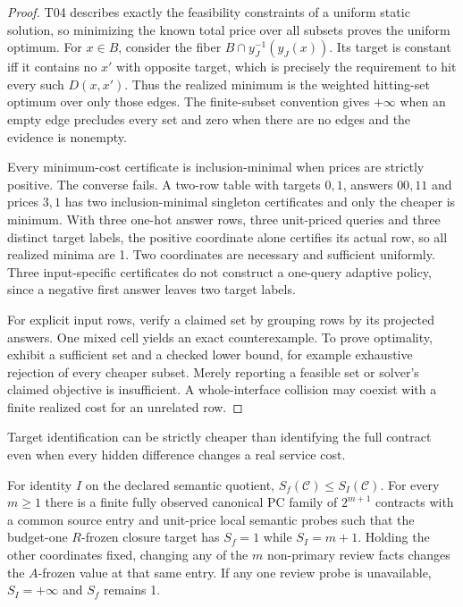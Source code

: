 \begin{proof}

T04 describes exactly the feasibility constraints of a uniform static solution, so minimizing the known total price over all subsets proves the uniform optimum. For \(x\in B\), consider the fiber \(B\cap y_J^{-1}(y_J(x))\). Its target is constant iff it contains no \(x'\) with opposite target, which is precisely the requirement to hit every such \(D(x,x')\). Thus the realized minimum is the weighted hitting-set optimum over only those edges. The finite-subset convention gives \(+\infty\) when an empty edge precludes every set and zero when there are no edges and the evidence is nonempty.

Every minimum-cost certificate is inclusion-minimal when prices are strictly positive. The converse fails. A two-row table with targets \(0,1\), answers \(00,11\) and prices \(3,1\) has two inclusion-minimal singleton certificates and only the cheaper is minimum. With three one-hot answer rows, three unit-priced queries and three distinct target labels, the positive coordinate alone certifies its actual row, so all realized minima are 1. Two coordinates are necessary and sufficient uniformly. Three input-specific certificates do not construct a one-query adaptive policy, since a negative first answer leaves two target labels.

For explicit input rows, verify a claimed set by grouping rows by its projected answers. One mixed cell yields an exact counterexample. To prove optimality, exhibit a sufficient set and a checked lower bound, for example exhaustive rejection of every cheaper subset. Merely reporting a feasible set or solver's claimed objective is insufficient. A whole-interface collision may coexist with a finite realized cost for an unrelated row.

\end{proof}

Target identification can be strictly cheaper than identifying the full contract even when every hidden difference changes a real service cost.

\begin{theorem}\label{thm:t07}

For identity \(I\) on the declared semantic quotient, \(S_f(\mathcal C)\le S_I(\mathcal C)\). For every \(m\ge1\) there is a finite fully observed canonical PC family of \(2^{m+1}\) contracts with a common source entry and unit-price local semantic probes such that the budget-one \(R\)-frozen closure target has \(S_f=1\) while \(S_I=m+1\). Holding the other coordinates fixed, changing any of the \(m\) non-primary review facts changes the \(A\)-frozen value at that same entry. If any one review probe is unavailable, \(S_I=+\infty\) and \(S_f\) remains 1.

\end{theorem}

